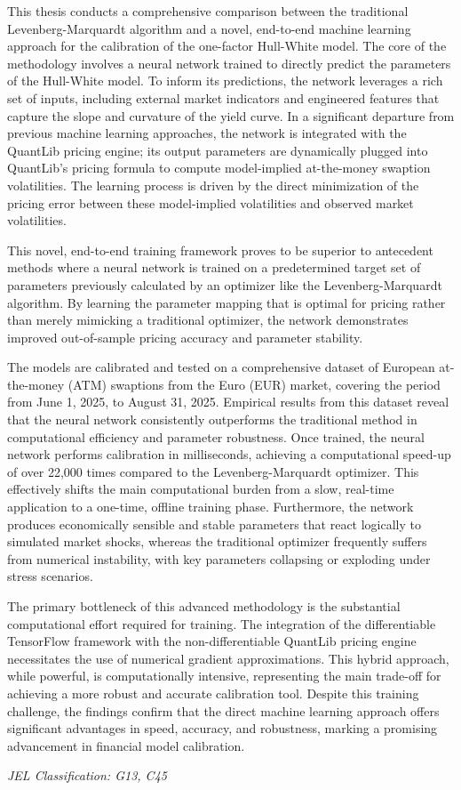 This thesis conducts a comprehensive comparison between the traditional Levenberg-Marquardt algorithm and a novel, end-to-end machine learning approach for the calibration of the one-factor Hull-White model. The core of the methodology involves a neural network trained to directly predict the parameters of the Hull-White model. To inform its predictions, the network leverages a rich set of inputs, including external market indicators and engineered features that capture the slope and curvature of the yield curve. In a significant departure from previous machine learning approaches, the network is integrated with the QuantLib pricing engine; its output parameters are dynamically plugged into QuantLib's pricing formula to compute model-implied at-the-money swaption volatilities. The learning process is driven by the direct minimization of the pricing error between these model-implied volatilities and observed market volatilities.

This novel, end-to-end training framework proves to be superior to antecedent methods where a neural network is trained on a predetermined target set of parameters previously calculated by an optimizer like the Levenberg-Marquardt algorithm. By learning the parameter mapping that is optimal for pricing rather than merely mimicking a traditional optimizer, the network demonstrates improved out-of-sample pricing accuracy and parameter stability.

The models are calibrated and tested on a comprehensive dataset of European at-the-money (ATM) swaptions from the Euro (EUR) market, covering the period from June 1, 2025, to August 31, 2025. Empirical results from this dataset reveal that the neural network consistently outperforms the traditional method in computational efficiency and parameter robustness. Once trained, the neural network performs calibration in milliseconds, achieving a computational speed-up of over 22,000 times compared to the Levenberg-Marquardt optimizer. This effectively shifts the main computational burden from a slow, real-time application to a one-time, offline training phase. Furthermore, the network produces economically sensible and stable parameters that react logically to simulated market shocks, whereas the traditional optimizer frequently suffers from numerical instability, with key parameters collapsing or exploding under stress scenarios.

The primary bottleneck of this advanced methodology is the substantial computational effort required for training. The integration of the differentiable TensorFlow framework with the non-differentiable QuantLib pricing engine necessitates the use of numerical gradient approximations. This hybrid approach, while powerful, is computationally intensive, representing the main trade-off for achieving a more robust and accurate calibration tool. Despite this training challenge, the findings confirm that the direct machine learning approach offers significant advantages in speed, accuracy, and robustness, marking a promising advancement in financial model calibration.

\textit{JEL Classification: G13, C45}